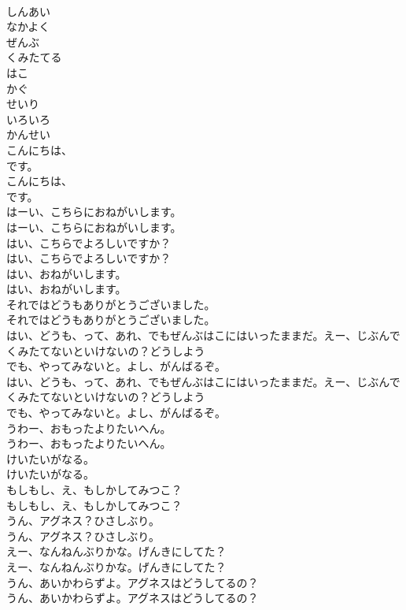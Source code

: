 \documentclass[8pt]{extreport}
\begin{document}
\begin{CJK}{UTF8}{min}
\\	しんあい
\\	なかよく
\\	ぜんぶ
\\	くみたてる
\\	はこ
\\	かぐ
\\	せいり
\\	いろいろ
\\	かんせい
\\	こんにちは、
\\	です。
\\	こんにちは、
\\	です。
\\	はーい、こちらにおねがいします。
\\	はーい、こちらにおねがいします。
\\	はい、こちらでよろしいですか？
\\	はい、こちらでよろしいですか？
\\	はい、おねがいします。
\\	はい、おねがいします。
\\	それではどうもありがとうございました。
\\	それではどうもありがとうございました。
\\	はい、どうも、って、あれ、でもぜんぶはこにはいったままだ。えー、じぶんでくみたてないといけないの？どうしよう
\\	でも、やってみないと。よし、がんばるぞ。
\\	はい、どうも、って、あれ、でもぜんぶはこにはいったままだ。えー、じぶんでくみたてないといけないの？どうしよう
\\	でも、やってみないと。よし、がんばるぞ。
\\	うわー、おもったよりたいへん。
\\	うわー、おもったよりたいへん。
\\	けいたいがなる。
\\	けいたいがなる。
\\	もしもし、え、もしかしてみつこ？
\\	もしもし、え、もしかしてみつこ？
\\	うん、アグネス？ひさしぶり。
\\	うん、アグネス？ひさしぶり。
\\	えー、なんねんぶりかな。げんきにしてた？
\\	えー、なんねんぶりかな。げんきにしてた？
\\	うん、あいかわらずよ。アグネスはどうしてるの？
\\	うん、あいかわらずよ。アグネスはどうしてるの？

\end{CJK}
\end{document}
